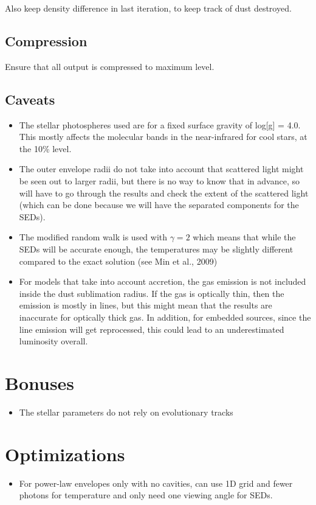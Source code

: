 \documentclass[10pt]{article}
\begin{document}
Also keep density difference in last iteration, to keep track of dust destroyed.

\subsection{Compression}

Ensure that all output is compressed to maximum level.

\subsection{Caveats}

\begin{itemize}

\item The stellar photospheres used are for a fixed surface gravity of log[g] = 4.0. This mostly affects the molecular bands in the near-infrared for cool stars, at the 10\% level.

\item The outer envelope radii do not take into account that scattered light might be seen out to larger radii, but there is no way to know that in advance, so will have to go through the results and check the extent of the scattered light (which can be done because we will have the separated components for the SEDs).

\item The modified random walk is used with $\gamma=2$ which means that while the SEDs will be accurate enough, the temperatures may be slightly different compared to the exact solution (see Min et al., 2009)

\item For models that take into account accretion, the gas emission is not included inside the dust sublimation radius. If the gas is optically thin, then the emission is mostly in lines, but this might mean that the results are inaccurate for optically thick gas. In addition, for embedded sources, since the line emission will get reprocessed, this could lead to an underestimated luminosity overall.

\end{itemize}

\section{Bonuses}

\begin{itemize}

\item The stellar parameters do not rely on evolutionary tracks

\end{itemize}

\section{Optimizations}

\begin{itemize}
\item For power-law envelopes only with no cavities, can use 1D grid and fewer photons for temperature and only need one viewing angle for SEDs.
\end{itemize}
\end{document}
